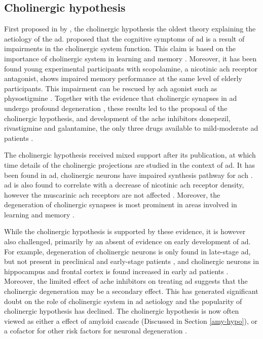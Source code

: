 \subsection{Cholinergic hypothesis\label{ach-hypo}}
First proposed in \citeyear{bartus82} by \citeauthor{bartus82}, the cholinergic hypothesis the oldest theory explaining the aetiology of the \gls{ad}. \citeauthor{bartus82} proposed that the cognitive symptoms of \gls{ad} is a result of impairments in the cholinergic system function. This claim is based on  the importance of cholinergic system in learning and memory \citep{deutsch71}. Moreover, it has been found young experimental participants with scopolamine, a nicotinic \gls{ach} receptor antagonist, shows impaired memory performance at the same level of elderly participants. This impairment can be rescued by \gls{ach} agonist such as physostigmine \citep{drachman74}. Together with the evidence that cholinergic synapses in \gls{ad} undergo profound degeneration \citep{whitehouse82}, these results led to the proposal of the cholinergic hypothesis, and development of the \gls{ache} inhibitors donepezil, rivastigmine and galantamine, the only three drugs available to mild-moderate \gls{ad} patients \citep[][; also see Section \ref{treatment}]{bartus00}. 

The cholinergic hypothesis received mixed support after its publication, at which time details of the cholinergic projections are studied in the context of \gls{ad}. It has been found in \gls{ad}, cholinergic neurons have impaired synthesis pathway for \gls{ach} \citep{milner87}. \gls{ad} is also found to correlate with a decrease of nicotinic \gls{ach} receptor density, however the muscarinic \gls{ach} receptors are not affected \citep{nordberg92, burghaus00}. Moreover, the degeneration of cholinergic synapses is most prominent in areas involved in learning and memory \citep{geula96}. 

While the cholinergic hypothesis is supported by these evidence, it is however also challenged, primarily by an absent of evidence on early development of \gls{ad}. For example, degeneration of cholinergic neurons is only found in late-stage \gls{ad}, but not present in preclinical and early-stage patients \citep{davis99}, and cholinergic neurons in hippocampus and frontal cortex is found increased in early \gls{ad} patients \citep{dekosky02}. Moreover, the limited effect of \gls{ache} inhibitors on treating \gls{ad} suggests that the cholinergic degeneration may be a secondary effect. This has generated significant doubt on the role of cholinergic system in \gls{ad} aetiology and the popularity of cholinergic hypothesis has declined. The cholinergic hypothesis is now often viewed as either a effect of amyloid cascade (Discussed in Section \ref{amy-hypo}), or a cofactor for other risk factors for neuronal degeneration \citep{roberson97, contestabile11}.



